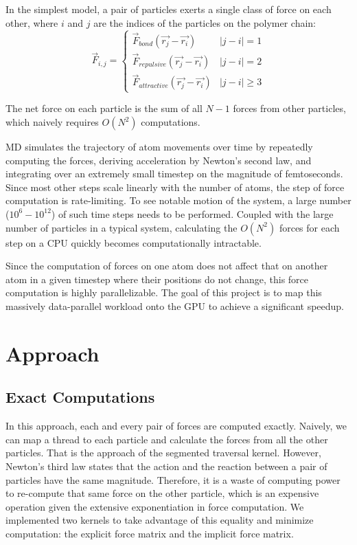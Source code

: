 \documentclass[12pt]{article}
\begin{document}
In the simplest model, a pair of particles exerts a single class of force on each other, where $i$ and $j$ are the indices of the particles on the polymer chain:
\begin{equation*}
    \vec{F}_{i,j} = \begin{cases}
        \vec{F}_{bond}(\vec{r_j}-\vec{r_i}) & |j-i|=1 \\
        \vec{F}_{repulsive}(\vec{r_j}-\vec{r_i}) & |j-i|=2 \\
        \vec{F}_{attractive}(\vec{r_j}-\vec{r_i}) & |j-i|\ge 3
    \end{cases}
\end{equation*}

The net force on each particle is the sum of all $N-1$ forces from other particles, which naively requires $O(N^2)$ computations.

MD simulates the trajectory of atom movements over time by repeatedly computing the forces, deriving acceleration by Newton’s second law, and integrating over an extremely small timestep on the magnitude of femtoseconds. Since most other steps scale linearly with the number of atoms, the step of force computation is rate-limiting. To see notable motion of the system, a large number ($10^6-10^{12}$) of such time steps needs to be performed. Coupled with the large number of particles in a typical system, calculating the $O(N^2)$ forces for each step on a CPU quickly becomes computationally intractable.

Since the computation of forces on one atom does not affect that on another atom in a given timestep where their positions do not change, this force computation is highly parallelizable. The goal of this project is to map this massively data-parallel workload onto the GPU to achieve a significant speedup.

\section{Approach}
\subsection{Exact Computations}
In this approach, each and every pair of forces are computed exactly. Naively, we can map a thread to each particle and calculate the forces from all the other particles. That is the approach of the segmented traversal kernel. However, Newton's third law states that the action and the reaction between a pair of particles have the same magnitude. Therefore, it is a waste of computing power to re-compute that same force on the other particle, which is an expensive operation given the extensive exponentiation in force computation. We implemented two kernels to take advantage of this equality and minimize computation: the explicit force matrix and the implicit force matrix.
\end{document}
